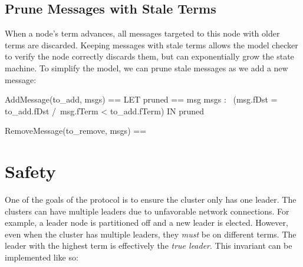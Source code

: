 \subsection{Prune Messages with Stale Terms}

When a node's term advances, all messages targeted to this node with older terms
are discarded. Keeping messages with stale terms allows the model checker to 
verify the node correctly discards them, but can exponentially grow the state
machine. To simplify the model, we can prune stale messages as we add a new 
message: \newline

\begin{tla}
AddMessage(to_add, msgs) == 
    LET 
        pruned == {msg \in msgs : 
                    ~(msg.fDst = to_add.fDst /\ msg.fTerm < to_add.fTerm)}
    IN
        pruned 

RemoveMessage(to_remove, msgs) ==
\end{tla}
\begin{tlatex}
%
%
%
%
%
\@pvspace{8.0pt}%
%
\end{tlatex}




\section{Safety}

One of the goals of the protocol is to ensure the cluster only has one leader.
The clusters can have multiple leaders due to unfavorable network connections. For example, a leader node is partitioned off and a new
leader is elected. However, even when the cluster has multiple leaders, they
\textit{must} be on different terms. The leader with the highest term is
effectively the \textit{true leader}. This invariant can be implemented like
so:\newline

